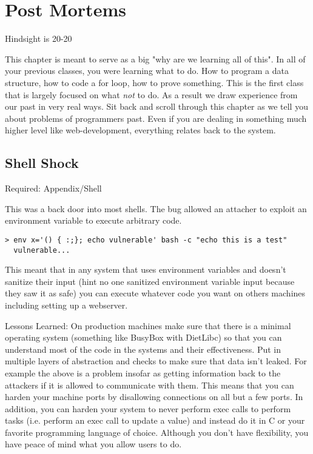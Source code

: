\chapter{Post Mortems}

\epigraph{Hindsight is 20-20}{}

This chapter is meant to serve as a big "why are we learning all of this". In all of your previous classes, you were learning what to do. How to program a data structure, how to code a for loop, how to prove something. This is the first class that is largely focused on what \textit{not} to do. As a result we draw experience from our past in very real ways. Sit back and scroll through this chapter as we tell you about problems of programmers past. Even if you are dealing in something much higher level like web-development, everything relates back to the system.

\section{Shell Shock}

Required: Appendix/Shell

This was a back door into most shells. The bug allowed an attacher to exploit an environment variable to execute arbitrary code.

\begin{lstlisting}[language=console]
  > env x='() { :;}; echo vulnerable' bash -c "echo this is a test"
  vulnerable...
\end{lstlisting}

This meant that in any system that uses environment variables and doesn't sanitize their input (hint no one sanitized environment variable input because they saw it as safe) you can execute whatever code you want on others machines including setting up a webserver.

Lessons Learned: On production machines make sure that there is a minimal operating system (something like BusyBox with DietLibc) so that you can understand most of the code in the systems and their effectiveness. Put in multiple layers of abstraction and checks to make sure that data isn't leaked. For example the above is a problem insofar as getting information back to the attackers if it is allowed to communicate with them. This means that you can harden your machine ports by disallowing connections on all but a few ports. In addition, you can harden your system to never perform exec calls to perform tasks (i.e. perform an exec call to update a value) and instead do it in C or your favorite programming language of choice. Although you don't have flexibility, you have peace of mind what you allow users to do.

